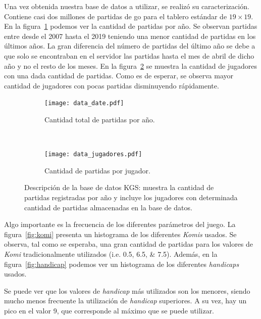 \documentclass[11pt,twoside, spanish]{report} %
\begin{document}
Una vez obtenida nuestra base de datos a utilizar, se realiz\'o su caracterizaci\'on.
Contiene casi dos millones de partidas de go para el tablero est\'andar de $19\times19$.
En la figura~\ref{fig:data} podemos ver la cantidad de partidas por a\~no.
Se observan partidas entre desde el 2007 hasta el 2019 teniendo una menor cantidad de partidas en los \'ultimos a\~nos.
La gran diferencia del n\'umero de partidas del \'ultimo a\~no se debe a que solo se encontraban en el servidor las partidas hasta el mes de abril de dicho a\~no y no el resto de los meses.
En la figura~\ref{fig:jugadores} se muestra la cantidad de jugadores con una dada cantidad de partidas.
Como es de esperar, se observa mayor cantidad de jugadores con pocas partidas disminuyendo r\'apidamente.

\begin{figure}[H]
	\centering
	\begin{subfigure}[t]{.49\textwidth}
		\centering
		\texttt{[image: data\_date.pdf]}
		\caption{Cantidad total de partidas por a\~no.}
		\label{fig:data}
	\end{subfigure}
	~
	\begin{subfigure}[t]{.49\textwidth}
		\centering
		\texttt{[image: data\_jugadores.pdf]}
		\caption{Cantidad de partidas por jugador.}
		\label{fig:jugadores}
	\end{subfigure}
	\caption{Descripci\'on de la base de datos KGS:  muestra la cantidad de partidas registradas por a\~no y  incluye los jugadores con determinada cantidad de partidas almacenadas en la base de datos. }
	\label{fig:dataJugadores}
\end{figure}



Algo importante es la frecuencia de los diferentes par\'ametros del juego.
La figura~\ref{fig:komi} presenta un histograma de los diferentes \textit{Komis} usados.
Se observa, tal como se esperaba, una gran cantidad de partidas para los valores de \textit{Komi} tradicionalmente utilizados (i.e. \numlist{0.5;6.5;7.5}).
Adem\'as, en la figura~\ref{fig:handicap} podemos ver un histograma de los diferentes \textit{handicaps} usados.

Se puede ver que los valores de \emph{handicap} m\'as utilizados son los menores, siendo mucho menos frecuente la utilizaci\'on de \emph{handicap} superiores.
A su vez, hay un pico en el valor 9, que corresponde al m\'aximo que se puede utilizar.
\end{document}
